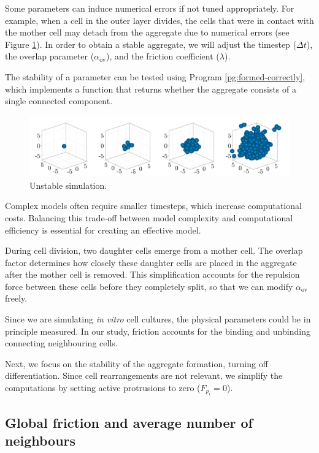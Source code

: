 Some parameters can induce numerical errors if not tuned appropriately. For example, when a cell in the outer layer divides, the cells that were in contact with the mother cell may detach from the aggregate due to numerical errors (see Figure \ref{fig:aggregate_broken}). In order to obtain a stable aggregate, we will adjust the timestep ($\Delta t$), the overlap parameter ($\alpha_\text{ov}$), and the friction coefficient ($\lambda$). 

The stability of a parameter can be tested using Program \ref{pg:formed-correctly}, which implements a function that returns whether the aggregate consists of a single connected component.

\begin{figure}[ht]
    \centering
    \includegraphics[width=\textwidth]{figures/400/400-aggregate-broken.png}
    \caption{Unstable simulation.}
    \label{fig:aggregate_broken}
\end{figure}

Complex models often require smaller timesteps, which increase computational costs. Balancing this trade-off between model complexity and computational efficiency is essential for creating an effective model.

During cell division, two daughter cells emerge from a mother cell. The overlap factor determines how closely these daughter cells are placed in the aggregate after the mother cell is removed. This simplification accounts for the repulsion force between these cells before they completely split, so that we can modify $\alpha_\text{ov}$ freely.

Since we are simulating \textit{in vitro} cell cultures, the physical parameters could be in principle measured. In our study, friction accounts for the binding and unbinding connecting neighbouring cells.

Next, we focus on the stability of the aggregate formation, turning off differentiation. Since cell rearrangements are not relevant, we simplify the computations by setting active protrusions to zero ($F_{p_i}=0$).


\subsection{Global friction and average number of neighbours}\label{sec:avg_nbs}

